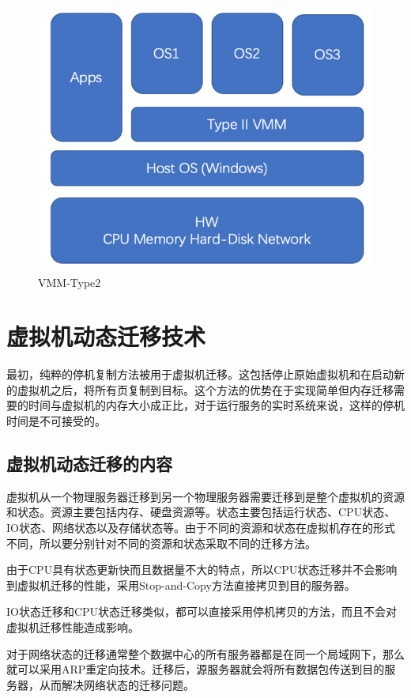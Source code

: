 \begin{figure}[htb]
  \centering
  \includegraphics{./Figure/IMG_Chap2_3.png}
  \caption{VMM-Type2}\label{Fig:chap2_3}
\end{figure}

\section{虚拟机动态迁移技术}
最初，纯粹的停机复制方法被用于虚拟机迁移。这包括停止原始虚拟机和在启动新的虚拟机之后，将所有页复制到目标。这个方法的优势在于实现简单但内存迁移需要的时间与虚拟机的内存大小成正比，对于运行服务的实时系统来说，这样的停机时间是不可接受的。

\subsection{虚拟机动态迁移的内容}
虚拟机从一个物理服务器迁移到另一个物理服务器需要迁移到是整个虚拟机的资源和状态。资源主要包括内存、硬盘资源等。状态主要包括运行状态、CPU状态、IO状态、网络状态以及存储状态等。由于不同的资源和状态在虚拟机存在的形式不同，所以要分别针对不同的资源和状态采取不同的迁移方法。

由于CPU具有状态更新快而且数据量不大的特点，所以CPU状态迁移并不会影响到虚拟机迁移的性能，采用Stop-and-Copy方法直接拷贝到目的服务器。

IO状态迁移和CPU状态迁移类似，都可以直接采用停机拷贝的方法，而且不会对虚拟机迁移性能造成影响。

对于网络状态的迁移通常整个数据中心的所有服务器都是在同一个局域网下，那么就可以采用ARP重定向技术。迁移后，源服务器就会将所有数据包传送到目的服务器，从而解决网络状态的迁移问题。
           
